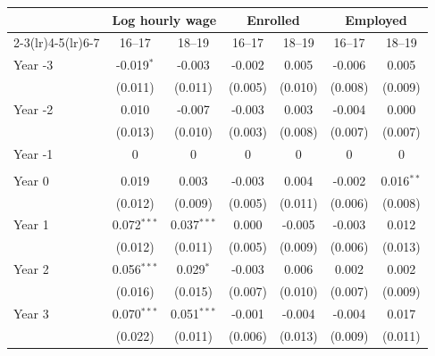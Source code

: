 \begin{tabular}{lcccccc}
\toprule
 & \multicolumn{2}{c}{Log hourly wage} & \multicolumn{2}{c}{Enrolled} & \multicolumn{2}{c}{Employed} \\
\cmidrule(lr){2-3}\cmidrule(lr){4-5}\cmidrule(lr){6-7}
 & 16--17 & 18--19 & 16--17 & 18--19 & 16--17 & 18--19 \\
\midrule
Year -3 & -0.019$^{*}$ & -0.003 & -0.002 & 0.005 & -0.006 & 0.005 \\
 & (0.011) & (0.011) & (0.005) & (0.010) & (0.008) & (0.009) \\
Year -2 & 0.010 & -0.007 & -0.003 & 0.003 & -0.004 & 0.000 \\
 & (0.013) & (0.010) & (0.003) & (0.008) & (0.007) & (0.007) \\
Year -1 & 0 & 0 & 0 & 0 & 0 & 0 \\
 &  &  &  &  &  &  \\
Year 0 & 0.019 & 0.003 & -0.003 & 0.004 & -0.002 & 0.016$^{**}$ \\
 & (0.012) & (0.009) & (0.005) & (0.011) & (0.006) & (0.008) \\
Year 1 & 0.072$^{***}$ & 0.037$^{***}$ & 0.000 & -0.005 & -0.003 & 0.012 \\
 & (0.012) & (0.011) & (0.005) & (0.009) & (0.006) & (0.013) \\
Year 2 & 0.056$^{***}$ & 0.029$^{*}$ & -0.003 & 0.006 & 0.002 & 0.002 \\
 & (0.016) & (0.015) & (0.007) & (0.010) & (0.007) & (0.009) \\
Year 3 & 0.070$^{***}$ & 0.051$^{***}$ & -0.001 & -0.004 & -0.004 & 0.017 \\
 & (0.022) & (0.011) & (0.006) & (0.013) & (0.009) & (0.011) \\
\bottomrule
\end{tabular}
